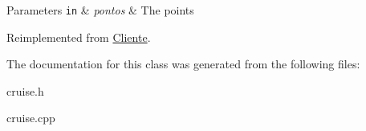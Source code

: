 \begin{DoxyParams}[1]{Parameters}
\mbox{\tt in}  & {\em pontos} & The points \\
\hline
\end{DoxyParams}


Reimplemented from \hyperlink{classCliente_ac56e5f622d2fc636e204fad0d7c3a36b}{Cliente}.



The documentation for this class was generated from the following files\+:\begin{DoxyCompactItemize}
\item 
cruise.\+h\item 
cruise.\+cpp\end{DoxyCompactItemize}
